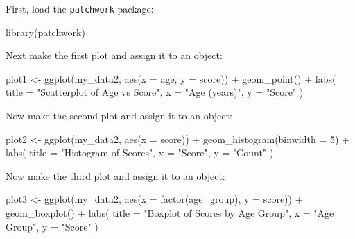 \documentclass[
  letterpaper,
  8pt,
  a4paper]{book}
\newenvironment{Shaded}{\begin{snugshade}}{\end{snugshade}}
\newcommand{\AttributeTok}[1]{\textcolor[rgb]{0.40,0.45,0.13}{#1}}
\newcommand{\DecValTok}[1]{\textcolor[rgb]{0.68,0.00,0.00}{#1}}
\newcommand{\FunctionTok}[1]{\textcolor[rgb]{0.28,0.35,0.67}{#1}}
\newcommand{\NormalTok}[1]{\textcolor[rgb]{0.00,0.23,0.31}{#1}}
\newcommand{\OtherTok}[1]{\textcolor[rgb]{0.00,0.23,0.31}{#1}}
\newcommand{\SpecialCharTok}[1]{\textcolor[rgb]{0.37,0.37,0.37}{#1}}
\newcommand{\StringTok}[1]{\textcolor[rgb]{0.13,0.47,0.30}{#1}}
\begin{document}
First, load the \texttt{patchwork} package:

\begin{Shaded}
\begin{Highlighting}[]
\FunctionTok{library}\NormalTok{(patchwork)}
\end{Highlighting}
\end{Shaded}

Next make the first plot and assign it to an object:

\begin{Shaded}
\begin{Highlighting}[]
\NormalTok{plot1 }\OtherTok{\textless{}{-}} \FunctionTok{ggplot}\NormalTok{(my\_data2, }\FunctionTok{aes}\NormalTok{(}\AttributeTok{x =}\NormalTok{ age, }\AttributeTok{y =}\NormalTok{ score)) }\SpecialCharTok{+}
  \FunctionTok{geom\_point}\NormalTok{() }\SpecialCharTok{+}
  \FunctionTok{labs}\NormalTok{(}
    \AttributeTok{title =} \StringTok{"Scatterplot of Age vs Score"}\NormalTok{,}
    \AttributeTok{x =} \StringTok{"Age (years)"}\NormalTok{,}
    \AttributeTok{y =} \StringTok{"Score"}
\NormalTok{  ) }
\end{Highlighting}
\end{Shaded}

Now make the second plot and assign it to an object:

\begin{Shaded}
\begin{Highlighting}[]
\NormalTok{plot2 }\OtherTok{\textless{}{-}} \FunctionTok{ggplot}\NormalTok{(my\_data2, }\FunctionTok{aes}\NormalTok{(}\AttributeTok{x =}\NormalTok{ score)) }\SpecialCharTok{+}
  \FunctionTok{geom\_histogram}\NormalTok{(}\AttributeTok{binwidth =} \DecValTok{5}\NormalTok{) }\SpecialCharTok{+}
  \FunctionTok{labs}\NormalTok{(}
    \AttributeTok{title =} \StringTok{"Histogram of Scores"}\NormalTok{,}
    \AttributeTok{x =} \StringTok{"Score"}\NormalTok{,}
    \AttributeTok{y =} \StringTok{"Count"}
\NormalTok{  ) }
\end{Highlighting}
\end{Shaded}

Now make the third plot and assign it to an object:

\begin{Shaded}
\begin{Highlighting}[]
\NormalTok{plot3 }\OtherTok{\textless{}{-}} \FunctionTok{ggplot}\NormalTok{(my\_data2, }\FunctionTok{aes}\NormalTok{(}\AttributeTok{x =} \FunctionTok{factor}\NormalTok{(age\_group), }\AttributeTok{y =}\NormalTok{ score)) }\SpecialCharTok{+}
  \FunctionTok{geom\_boxplot}\NormalTok{() }\SpecialCharTok{+}
  \FunctionTok{labs}\NormalTok{(}
    \AttributeTok{title =} \StringTok{"Boxplot of Scores by Age Group"}\NormalTok{,}
    \AttributeTok{x =} \StringTok{"Age Group"}\NormalTok{,}
    \AttributeTok{y =} \StringTok{"Score"}
\NormalTok{  ) }
\end{Highlighting}
\end{Shaded}
\end{document}
